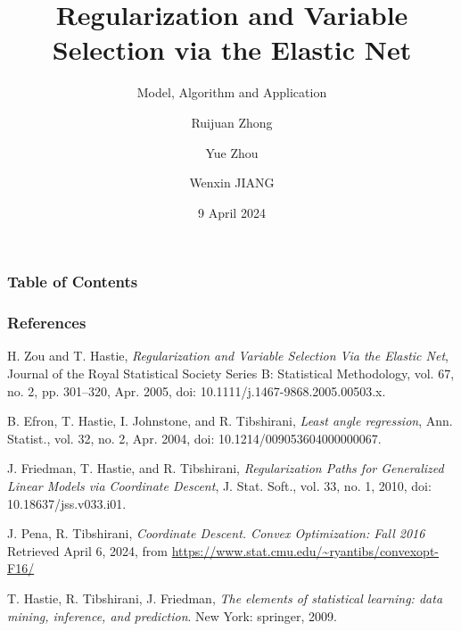 \documentclass{beamer}
\title[GLM Net] %
{Regularization and Variable Selection via the Elastic Net}
\subtitle{Model, Algorithm and Application}
\author[BIOS] %
{Ruijuan Zhong \and Yue Zhou \and Wenxin JIANG} %
\institute[CityU HK] %
{
  Department of Biostatistics\\
  City University of Hong Kong
}
\date[April 2024] %
{9 April 2024}
\begin{document}
\frame{\titlepage}
\begin{frame}
\frametitle{Table of Contents}
\tableofcontents
\end{frame}







\begin{frame}%
\frametitle{References}

\begin{thebibliography}{99}
\small
{}
H. Zou and T. Hastie, \emph{Regularization and Variable Selection Via the Elastic Net}, Journal of the Royal Statistical Society Series B: Statistical Methodology, vol. 67, no. 2, pp. 301–320, Apr. 2005, doi: 10.1111/j.1467-9868.2005.00503.x.

B. Efron, T. Hastie, I. Johnstone, and R. Tibshirani, \emph{Least angle regression}, Ann. Statist., vol. 32, no. 2, Apr. 2004, doi: 10.1214/009053604000000067.

J. Friedman, T. Hastie, and R. Tibshirani, \emph{Regularization Paths for Generalized Linear Models via Coordinate Descent}, J. Stat. Soft., vol. 33, no. 1, 2010, doi: 10.18637/jss.v033.i01.


J. Pena, R. Tibshirani, \emph{Coordinate Descent. Convex Optimization: Fall 2016} Retrieved April 6, 2024, from \url{https://www.stat.cmu.edu/~ryantibs/convexopt-F16/}

T. Hastie, R. Tibshirani, J. Friedman, \emph{The elements of statistical learning: data mining, inference, and prediction}. New York: springer, 2009.
\end{thebibliography}

\end{frame}
\end{document}
